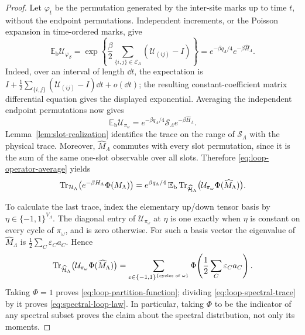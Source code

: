 \begin{proof}
Let $\varphi_t$ be the permutation generated by the inter-site marks
up to time $t$, without the endpoint permutations.  Independent
increments, or the Poisson expansion in time-ordered marks, give
\[
 \mathbb E_{\mathrm b}\mathcal U_{\varphi_\beta}
   =\exp\!\left\{
       \frac\beta2\sum_{\{i,j\}\in\mathcal E_\Lambda}
                    (\mathcal U_{(ij)}-I)\right\}
   =e^{-\beta q_\Lambda/4}e^{-\beta\widehat H_\Lambda}.
\]
Indeed, over an interval of length $\dd t$, the expectation is
$I+\frac12\sum_{\{i,j\}}(\mathcal U_{(ij)}-I)\dd t+o(\dd t)$;
the resulting constant-coefficient matrix differential equation gives
the displayed exponential.  Averaging the independent endpoint
permutations now gives
\begin{equation}\label{eq:loop-operator-average}
 \mathbb E_{\mathrm b}\mathcal U_{\pi_\omega}
    =e^{-\beta q_\Lambda/4}
                   \mathcal S_\Lambda e^{-\beta\widehat H_\Lambda}.
\end{equation}
Lemma~\ref{lem:slot-realization} identifies the trace on the range of
$\mathcal S_\Lambda$ with the physical trace.  Moreover,
$\widehat M_\Lambda$ commutes with every slot permutation, since it
is the sum of the same one-slot observable over all slots.  Therefore
\eqref{eq:loop-operator-average} yields
\begin{equation}\label{eq:loop-spectral-trace}
 \operatorname{Tr}_{\mathcal H_\Lambda}
       \bigl(e^{-\beta H_\Lambda}\Phi(M_\Lambda)\bigr)
 =e^{\beta q_\Lambda/4}\,
   \mathbb E_{\mathrm b}\operatorname{Tr}_{\widehat{\mathcal H}_\Lambda}
       \bigl(\mathcal U_{\pi_\omega}\Phi(\widehat M_\Lambda)\bigr).
\end{equation}

To calculate the last trace, index the elementary up/down tensor
basis by $\eta\in\{-1,1\}^{V_\Lambda}$.  The diagonal entry of
$\mathcal U_{\pi_\omega}$ at $\eta$ is one exactly when $\eta$ is
constant on every cycle of $\pi_\omega$, and is zero otherwise.
For such a basis vector the eigenvalue of $\widehat M_\Lambda$ is
$\frac12\sum_C\varepsilon_Ca_C$.  Hence
\[
 \operatorname{Tr}_{\widehat{\mathcal H}_\Lambda}
       \bigl(\mathcal U_{\pi_\omega}\Phi(\widehat M_\Lambda)\bigr)
   =\sum_{\varepsilon\in\{-1,1\}^{\{\text{cycles of }\omega\}}}
          \Phi\!\left(\frac12\sum_C\varepsilon_Ca_C\right).
\]
Taking $\Phi=1$ proves \eqref{eq:loop-partition-function}; dividing
\eqref{eq:loop-spectral-trace} by it proves
\eqref{eq:spectral-loop-law}.  In particular, taking $\Phi$ to be
the indicator of any spectral subset proves the claim about the
spectral distribution, not only its moments.
\end{proof}

